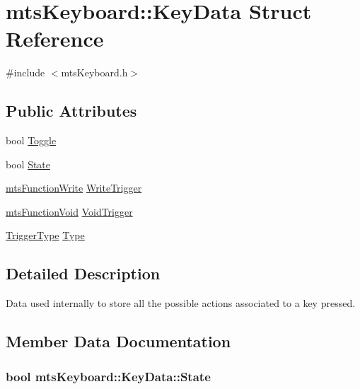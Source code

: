 \hypertarget{structmts_keyboard_1_1_key_data}{}\section{mts\+Keyboard\+:\+:Key\+Data Struct Reference}
\label{structmts_keyboard_1_1_key_data}


{\ttfamily \#include $<$mts\+Keyboard.\+h$>$}

\subsection*{Public Attributes}
\begin{DoxyCompactItemize}
\item 
bool \hyperlink{structmts_keyboard_1_1_key_data_a7a7e12ddde72dfaa2f297a3a706d79e6}{Toggle}
\item 
bool \hyperlink{structmts_keyboard_1_1_key_data_a5903bc84ec70c923b46a43326ef55009}{State}
\item 
\hyperlink{classmts_function_write}{mts\+Function\+Write} \hyperlink{structmts_keyboard_1_1_key_data_a564f0bb039d8cd597235a73b9f06cf4c}{Write\+Trigger}
\item 
\hyperlink{classmts_function_void}{mts\+Function\+Void} \hyperlink{structmts_keyboard_1_1_key_data_a560e2370eb7f17e4c784e81d228e514a}{Void\+Trigger}
\item 
\hyperlink{classmts_keyboard_a4a455c544287ea2a16f3353a5fe379c4}{Trigger\+Type} \hyperlink{structmts_keyboard_1_1_key_data_ab2b6df8b50b8ada66a61e6412644e0d3}{Type}
\end{DoxyCompactItemize}


\subsection{Detailed Description}
Data used internally to store all the possible actions associated to a key pressed. 

\subsection{Member Data Documentation}
\hypertarget{structmts_keyboard_1_1_key_data_a5903bc84ec70c923b46a43326ef55009}{}
\subsubsection[{State}]{\setlength{\rightskip}{0pt plus 5cm}bool mts\+Keyboard\+::\+Key\+Data\+::\+State}\label{structmts_keyboard_1_1_key_data_a5903bc84ec70c923b46a43326ef55009}
\hypertarget{structmts_keyboard_1_1_key_data_a7a7e12ddde72dfaa2f297a3a706d79e6}{}

